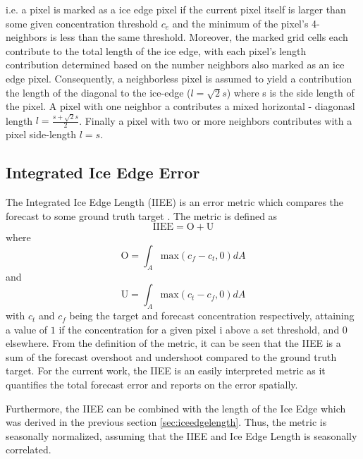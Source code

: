 \documentclass[../main/thesis.tex]{subfiles}
\begin{document}
i.e. a pixel is marked as a ice edge pixel if the current pixel itself is larger than some given concentration threshold $c_e$ and the minimum of the pixel's 4-neighbors is less than the same threshold. Moreover, the marked grid cells each contribute to the total length of the ice edge, with each pixel's length contribution determined based on the number neighbors also marked as an ice edge pixel. Consequently, a neighborless pixel is assumed to yield a contribution the length of the diagonal to the ice-edge ($l = \sqrt2s$) where s is the side length of the pixel. A pixel with one neighbor a contributes a mixed horizontal - diagonasl length $l = \frac{s + \sqrt2s}{2}$. Finally a pixel with two or more neighbors contributes with a pixel side-length $l = s$.

\subsection{Integrated Ice Edge Error}
The Integrated Ice Edge Length (IIEE) is an error metric which compares the forecast to some ground truth target \cite{Goessling2016}. The metric is defined as 
\begin{equation}
    \text{IIEE} = \text{O} + \text{U}
\end{equation}
where 
\begin{equation}
    \text{O} = \int_A\text{max}(c_f - c_t, 0)dA
\end{equation}
and
\begin{equation}
    \text{U} = \int_A\text{max}(c_t - c_f, 0)dA
\end{equation}
with $c_t$ and $c_f$ being the target and forecast concentration respectively, attaining a value of $1$ if the concentration for a given pixel i above a set threshold, and 0 elsewhere. From the definition of the metric, it can be seen that the IIEE is a sum of the forecast overshoot and undershoot compared to the ground truth target. For the current work, the IIEE is an easily interpreted metric as it quantifies the total forecast error and reports on the error spatially. 

Furthermore, the IIEE can be combined with the length of the Ice Edge which was derived in the previous section \ref{sec:iceedgelength}. Thus, the metric is seasonally normalized, assuming that the IIEE and Ice Edge Length is seasonally correlated.  

\biblio
\end{document}
